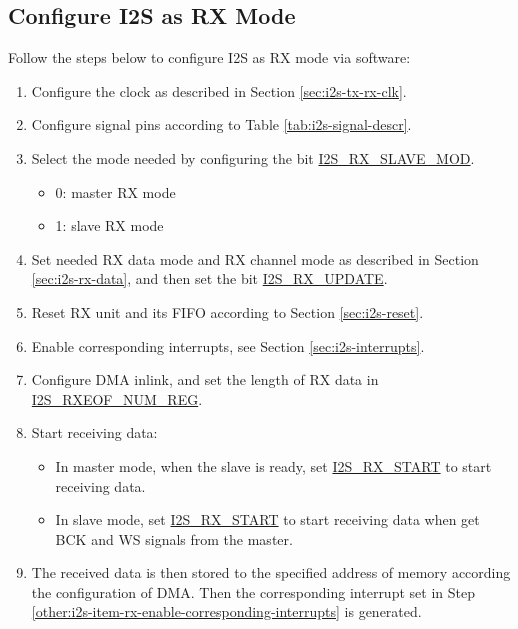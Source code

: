 \documentclass[main\_\_EN.tex]{subfiles}
\begin{document}
\subsection{Configure I2S as RX Mode}\label{sec:i2s-configure-i2s-rx-mode}
Follow the steps below to configure I2S as RX mode via software:

\begin{enumerate}
    \item Configure the clock as described in Section \ref{sec:i2s-tx-rx-clk}.

    \item Configure signal pins according to Table \ref{tab:i2s-signal-descr}.

    \item Select the mode needed by configuring the bit \hyperref[fielddesc:I2SRXSLAVEMOD]{I2S\_RX\_SLAVE\_MOD}.
    \begin{itemize}
        \item 0: master RX mode
        \item 1: slave RX mode
    \end{itemize}
    
    \item Set needed RX data mode and RX channel mode as described in Section \ref{sec:i2s-rx-data}, and then set the bit \hyperref[fielddesc:I2SRXUPDATE]{I2S\_RX\_UPDATE}.

    \item Reset RX unit and its FIFO according to Section \ref{sec:i2s-reset}.
    \item Enable corresponding interrupts, see Section \ref{sec:i2s-interrupts}.\label{other:i2s-item-rx-enable-corresponding-interrupts}
    
    \item Configure DMA inlink, and set the length of RX data in  \hyperref[regdesc:I2SRXEOFNUMREG]{ I2S\_RXEOF\_NUM\_REG}.

    \item Start receiving data:
    \begin{itemize}
        \item In master mode, when the slave is ready, set  \hyperref[fielddesc:I2SRXSTART]{I2S\_RX\_START} to start receiving data.
        \item In slave mode, set  \hyperref[fielddesc:I2SRXSTART]{I2S\_RX\_START} to start receiving data when get BCK and WS signals from the master.
    \end{itemize}
    \item The received data is then stored to the specified address of \chipname{} memory according the configuration of DMA. Then the corresponding interrupt set in Step \ref{other:i2s-item-rx-enable-corresponding-interrupts} is generated.
\end{enumerate}
\end{document}

